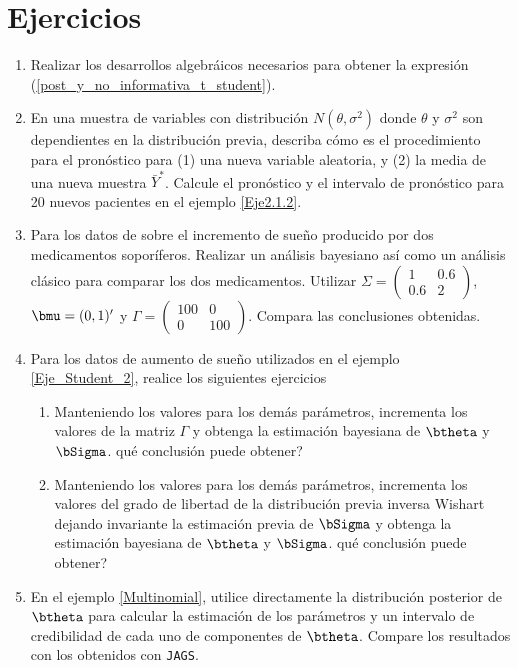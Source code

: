 \documentclass[10pt,openright]{book}\usepackage[]{graphicx}\usepackage[]{color}
\begin{document}
                                      
\section{Ejercicios}
\begin{enumerate}
\item Realizar los desarrollos algebr\'aicos necesarios para obtener la expresi\'on (\ref{post_y_no_informativa_t_student}).
\item En una muestra de variables con distribuci\'on $N(\theta,\sigma^2)$ donde $\theta$ y $\sigma^2$ son dependientes en la distribuci\'on previa, describa c\'omo es el procedimiento para el pron\'ostico para (1) una nueva variable aleatoria, y (2) la media de una nueva muestra $\bar{Y}^*$. Calcule el pron\'ostico y el intervalo de pron\'ostico para 20 nuevos pacientes en el ejemplo \ref{Eje2.1.2}.
\item Para los datos de  sobre el incremento de sue\~no producido por dos medicamentos sopor\'iferos. Realizar un an\'alisis bayesiano as\'i como un an\'alisis cl\'asico para comparar los dos medicamentos. Utilizar $\Sigma=\begin{pmatrix}1&0.6\\ 0.6&2\end{pmatrix}$, $\bmu=(0,1)'$ y $\Gamma=\begin{pmatrix}100&0\\ 0&100\end{pmatrix}$. Compara las conclusiones obtenidas.
\item Para los datos de aumento de sue\~no utilizados en el ejemplo \ref{Eje_Student_2}, realice los siguientes ejercicios
\begin{enumerate}
  \item Manteniendo los valores para los dem\'as par\'ametros, incrementa los valores de la matriz $\Gamma$ y obtenga la estimaci\'on bayesiana de $\btheta$ y $\bSigma$. qu\'e conclusi\'on puede obtener?
  \item Manteniendo los valores para los dem\'as par\'ametros, incrementa los valores del grado de libertad de la distribuci\'on previa inversa Wishart dejando invariante la estimaci\'on previa de $\bSigma$ y obtenga la estimaci\'on bayesiana de $\btheta$ y $\bSigma$. qu\'e conclusi\'on puede obtener?
\end{enumerate}
\item En el ejemplo \ref{Multinomial}, utilice directamente la distribuci\'on posterior de $\btheta$ para calcular la estimaci\'on de los par\'ametros y un intervalo de credibilidad de cada uno de componentes de $\btheta$. Compare los resultados con los obtenidos con \verb'JAGS'.
\end{enumerate}
\end{document}
